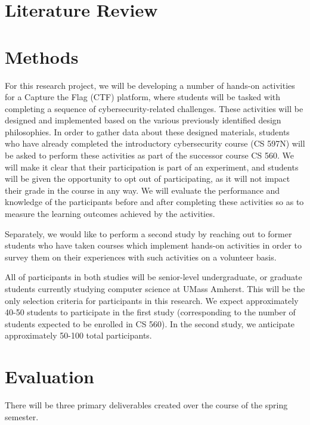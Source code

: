 \documentclass{article}
\begin{document}
\section{Literature Review}

        

\section{Methods}

    For this research project, we will be developing a number of hands-on activities for a Capture the Flag (CTF) platform, where students will be tasked with completing a sequence of cybersecurity-related challenges.
    These activities will be designed and implemented based on the various previously identified design philosophies. 
    In order to gather data about these designed materials, students who have already completed the introductory cybersecurity course (CS 597N) will be asked to perform these activities as part of the successor course CS 560.
    We will make it clear that their participation is part of an experiment, and students will be given the opportunity to opt out of participating, as it will not impact their grade in the course in any way.
    We will evaluate the performance and knowledge of the participants before and after completing these activities so as to measure the learning outcomes achieved by the activities. 

    Separately, we would like to perform a second study by reaching out to former students who have taken courses which implement hands-on activities in order to survey them on their experiences with such activities on a volunteer basis. 

    All of participants in both studies will be senior-level undergraduate, or graduate students currently studying computer science at UMass Amherst. 
    This will be the only selection criteria for participants in this research. 
    We expect approximately 40-50 students to participate in the first study (corresponding to the number of students expected to be enrolled in CS 560).
    In the second study, we anticipate approximately 50-100 total participants. 

\section{Evaluation}

    There will be three primary deliverables created over the course of the spring semester.
\end{document}

